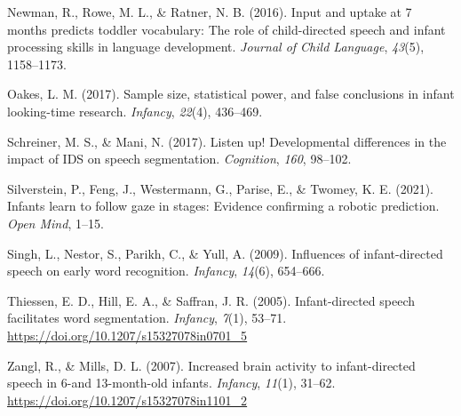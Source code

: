 \documentclass[
  man,floatsintext]{apa6}
\newlength{\cslhangindent}
\newlength{\cslentryspacingunit} %
\newenvironment{CSLReferences}[2] %
 {%
  \setlength{\parindent}{0pt}
  \ifodd #1
  \let\oldpar\par
  \def\par{\hangindent=\cslhangindent\oldpar}
  \fi
  \setlength{\parskip}{#2\cslentryspacingunit}
 }%
 {}
\begin{document}
\begin{CSLReferences}{1}{0}
\leavevmode{}%
Newman, R., Rowe, M. L., \& Ratner, N. B. (2016). Input and uptake at 7 months predicts toddler vocabulary: The role of child-directed speech and infant processing skills in language development. \emph{Journal of Child Language}, \emph{43}(5), 1158--1173.

\leavevmode{}%
Oakes, L. M. (2017). Sample size, statistical power, and false conclusions in infant looking-time research. \emph{Infancy}, \emph{22}(4), 436--469.

\leavevmode{}%
Schreiner, M. S., \& Mani, N. (2017). Listen up! Developmental differences in the impact of IDS on speech segmentation. \emph{Cognition}, \emph{160}, 98--102.

\leavevmode{}%
Silverstein, P., Feng, J., Westermann, G., Parise, E., \& Twomey, K. E. (2021). Infants learn to follow gaze in stages: Evidence confirming a robotic prediction. \emph{Open Mind}, 1--15.

\leavevmode{}%
Singh, L., Nestor, S., Parikh, C., \& Yull, A. (2009). Influences of infant-directed speech on early word recognition. \emph{Infancy}, \emph{14}(6), 654--666.

\leavevmode{}%
Thiessen, E. D., Hill, E. A., \& Saffran, J. R. (2005). Infant-directed speech facilitates word segmentation. \emph{Infancy}, \emph{7}(1), 53--71. \url{https://doi.org/10.1207/s15327078in0701_5}

\leavevmode{}%
Zangl, R., \& Mills, D. L. (2007). Increased brain activity to infant-directed speech in 6-and 13-month-old infants. \emph{Infancy}, \emph{11}(1), 31--62. \url{https://doi.org/10.1207/s15327078in1101_2}

\end{CSLReferences}

\endgroup
\end{document}
